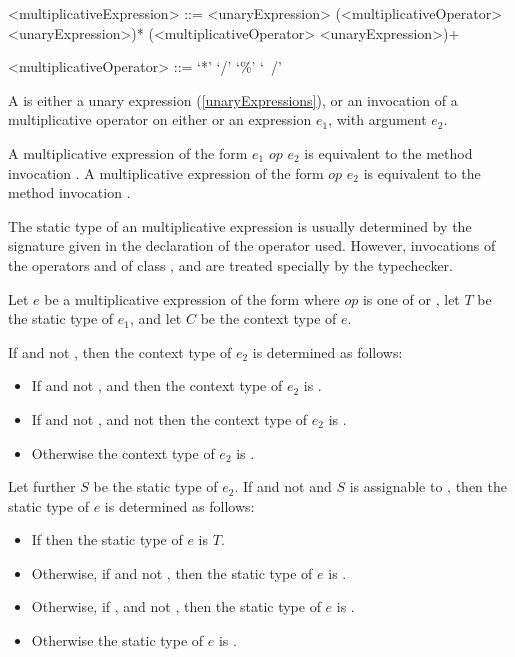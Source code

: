 \documentclass[makeidx]{article}
\begin{document}
{\begin{grammar}
<multiplicativeExpression> ::= \gnewline{}
  <unaryExpression> (<multiplicativeOperator> <unaryExpression>)*
  \alt \SUPER{} (<multiplicativeOperator> <unaryExpression>)+

<multiplicativeOperator> ::= `*'
  \alt `/'
  \alt `\%'
  \alt `~/'
\end{grammar}

\LMHash{}%
A  is either a unary expression
(\ref{unaryExpressions}),
or an invocation of a multiplicative operator
on either \SUPER{} or an expression $e_1$,
with argument $e_2$.

\LMHash{}%
A multiplicative expression of the form $e_1$ $op$ $e_2$ is equivalent to
the method invocation .
A multiplicative expression of the form \SUPER{} $op$ $e_2$ is equivalent to
the method invocation .

\LMHash{}%
The static type of an multiplicative expression is usually determined
by the signature given in the declaration of the operator used.
However, invocations of the operators \code{*} and \code{\%} of
class ,  and 
are treated specially by the typechecker.

\LMHash{}%
Let $e$ be a multiplicative expression of the form 
where $op$ is one of \code{*} or \code{\%},
let $T$ be the static type of $e_1$,
and let $C$ be the context type of $e$.

If  and not , then
the context type of $e_2$ is determined as follows:
\begin{itemize}
  \item{} If  and not ,
      and 
      then the context type of $e_2$ is .
  \item{} If  and not ,
      and not 
     then the context type of $e_2$ is .
  \item{} Otherwise the context type of $e_2$ is .
\end{itemize}
Let further $S$ be the static type of $e_2$.
If  and not 
and $S$ is assignable to ,
then the static type of $e$ is determined as follows:
\begin{itemize}
  \item{} If 
    then the static type of $e$ is $T$.
  \item{} Otherwise, if 
    and not ,
    then the static type of $e$ is .
  \item{} Otherwise, if ,
     and not ,
    then the static type of $e$ is .
  \item{} Otherwise the static type of $e$ is .
\end{itemize}


}
\end{document}
